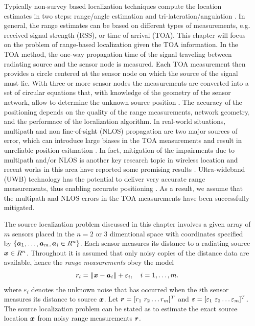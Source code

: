 Typically non-survey based localization techniques compute the location estimates in two steps: range/angle estimation and tri-lateration/angulation \cite{GeoLoc}. In general, the range estimates can be based on different types of measurements, e.g. received signal strength (RSS), %
or time of arrival (TOA). %
This chapter will focus on the  problem of range-based localization given the TOA information. In the TOA method, the one-way propagation time of the signal traveling between radiating source and the sensor node is measured. Each TOA measurement then provides a circle centered at the sensor node on which the source of the signal must lie. With three or more sensor nodes the measurements are converted into a set of circular equations that, with knowledge of the geometry of the sensor network, allow to determine the unknown source position \cite{GeoLoc}. The accuracy of the positioning depends on the quality of the range measurements, network geometry, and the performace of the localization algorithm. In real-world situations, multipath and non line-of-sight (NLOS) propagation are two major sources of error, which can introduce large biases in the TOA measurements and result in unreliable position esitmation \cite{classMDS}. In fact, mitigation of the impairments due to multipath and/or NLOS is another key
research topic in wireless location and recent works in this area have reported some promising results \cite{DarWinUWB}. Ultra-wideband (UWB) technology has the potential to deliver very accurate range measurements, thus enabling accurate positioning \cite{RydstromUWB, UWB, DarWinUWB}. As a result, we assume that the multipath and NLOS errors in the TOA measurements have been successfully mitigated.  

The source localization problem discussed in this chapter involves a given array of $m$ sensors placed in the $n = 2$ or 3 dimentional space with coordinates specified by $\{\mbox{\boldmath$a$}_1,\ldots, \mbox{\boldmath$a$}_m, \mbox{\boldmath$a$}_i\in R^n\}$. Each sensor measures its distance to a radiating source $\mbox{\boldmath$x$}\in R^n$. Throughout it is assumed that only noisy copies of the distance data are available, hence the \textit{range measurements} obey the model
\begin{equation} \label{eq:4.1}
\setcounter{equation}{1}
r_i = \|{\Bx} - {\Ba}_i\| + \varepsilon_i, \quad i = 1, \ldots , m.
\end{equation}    
where $\varepsilon_i$ denotes the unknown noise that has occurred when the $i$th sensor measures its distance to source $\mbox{\boldmath$x$}$. Let $\mbox{\boldmath$r$}=[r_1 \ r_2 \ldots r_m]^T$ and $\mbox{\boldmath${\varepsilon}$}=[\varepsilon_1 \ \varepsilon_2 \ldots \varepsilon_m]^T$.  The source localization problem can be stated as to estimate the exact source location $\mbox{\boldmath$x$}$ from noisy range measurements $\mbox{\boldmath$r$}$. 

